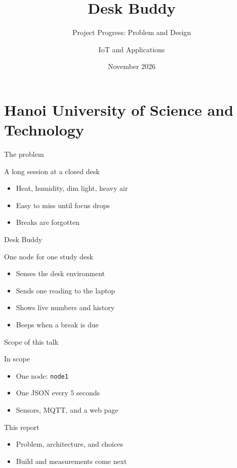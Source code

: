 \documentclass[pdf]{beamer}
\title{Desk Buddy}
\subtitle{Project Progress: Problem and Design}
\author{IoT and Applications}
\institute{Hanoi University of Science and Technology}
\date{November 2026}
\begin{document}
\section{Hanoi University of Science and Technology}
\huge
\maketitle
\footnotesize

\begin{frame}{The problem}
\transsplitverticalin
    \begin{block}{A long session at a closed desk}
        \begin{itemize}
            \item Heat, humidity, dim light, heavy air
            \item Easy to miss until focus drops
            \item Breaks are forgotten
        \end{itemize}
    \end{block}
\end{frame}

\begin{frame}{Desk Buddy}
\transsplitverticalout
    \begin{block}{One node for one study desk}
        \begin{itemize}
            \item Senses the desk environment
            \item Sends one reading to the laptop
            \item Shows live numbers and history
            \item Beeps when a break is due
        \end{itemize}
    \end{block}
\end{frame}

\begin{frame}{Scope of this talk}
    \begin{block}{In scope}
        \begin{itemize}
            \item One node: \texttt{node1}
            \item One JSON every 5 seconds
            \item Sensors, MQTT, and a web page
        \end{itemize}
    \end{block}
    \begin{block}{This report}
        \begin{itemize}
            \item Problem, architecture, and choices
            \item Build and measurements come next
        \end{itemize}
    \end{block}
\end{frame}
\end{document}
